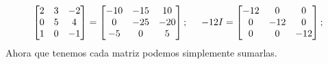\[\begin{aligned}
\begin{bmatrix}
                2 & 3 & -2 \\ 
                0 & 5 & 4 \\ 
                1 & 0 & -1
            \end{bmatrix}
            =
            \begin{bmatrix}
                -10 & -15 & 10 \\ 
                0 & -25 & -20 \\ 
                -5 & 0 & 5
            \end{bmatrix};
            \hspace{0.5cm}
            -12I =
            \begin{bmatrix}
                -12 & 0 & 0 \\
                0 & -12 & 0 \\
                0 & 0 & -12
            \end{bmatrix};
        \end{aligned}
    \]
    Ahora que tenemos cada matriz podemos simplemente sumarlas.
